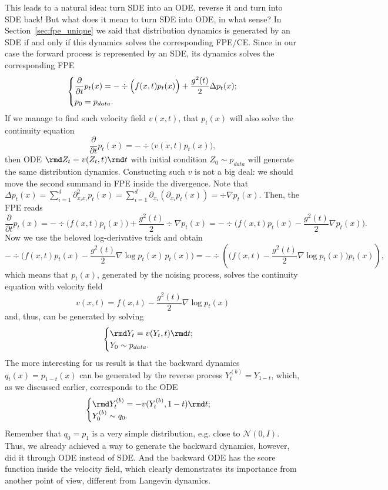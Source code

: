 This leads to a natural idea: turn SDE into an ODE, reverse it and turn into SDE back! But what does it mean to turn SDE into ODE, in what sense? In Section~\ref{sec:fpe_unique} we said that distribution dynamics is generated by an SDE if and only if this dynamics solves the corresponding FPE/CE. Since in our case the forward process is represented by an SDE, its dynamics solves the corresponding FPE
\[
    \begin{dcases}
        \frac{\partial}{\partial t} p_t(x) = -\div\Big(f(x, t)p_t(x)\Big) + \frac{g^2(t)}{2} \Delta p_t(x);\\
        p_0 = p_{data}.
    \end{dcases}
\]
If we manage to find such velocity field $v(x, t)$, that $p_t(x)$ will also solve the continuity equation 
\[
    \frac{\partial}{\partial t} p_t(x) = -\div \Big(v(x, t)p_t(x)\Big),
\]
then ODE $\rmd Z_t = v(Z_t, t)\rmd t$ with initial condition $Z_0 \sim p_{data}$ will generate the same distribution dynamics. Constucting such $v$ is not a big deal: we should move the second summand in FPE inside the divergence. Note that $\Delta p_t(x) = \sum_{i = 1}^{d}\partial^2_{x_i x_i} p_t(x) = \sum_{i = 1}^{d} \partial_{x_i}(\partial_{x_i} p_t(x)) = \div \nabla p_t(x)$. Then, the FPE reads
\[
    \frac{\partial}{\partial t} p_t(x) = -\div\Big(f(x, t)p_t(x)\Big) + \frac{g^2(t)}{2} \div \nabla p_t(x) = -\div\Big(f(x, t)p_t(x) - \frac{g^2(t)}{2} \nabla p_t(x) \Big).
\]
Now we use the beloved log-derivative trick and obtain
\[
    -\div\Big(f(x, t)p_t(x) - \frac{g^2(t)}{2}\nabla \log p_t(x) \, p_t(x)\Big) = -\div\left(\Big(f(x, t) - \frac{g^2(t)}{2} \nabla \log p_t(x)\Big)p_t(x)\right),
\]
which means that $p_t(x)$, generated by the noising process, solves the continuity equation with velocity field
\[
    v(x, t) = f(x, t) - \frac{g^2(t)}{2} \nabla \log p_t(x)
\]
and, thus, can be generated by solving
\[
    \begin{cases}
        \rmd Y_t = v(Y_t, t) \rmd t;\\
        Y_0 \sim p_{data}.
    \end{cases}
\]
The more interesting for us result is that the backward dynamics $q_t(x) = p_{1 - t}(x)$ can be generated by the reverse process $Y_t^{(b)} = Y_{1 - t}$, which, as we discussed earlier, corresponds to the ODE
\[
    \begin{cases}
        \rmd Y_t^{(b)} = -v(Y_t^{(b)}, 1 - t)\rmd t;\\
        Y_0^{(b)} \sim q_0.
    \end{cases}
\]
Remember that $q_0 = p_1$ is a very simple distribution, e.g. close to $\mathcal{N}(0, I)$. Thus, we already achieved a way to generate the backward dynamics, however, did it through ODE instead of SDE. And the backward ODE has the score function inside the velocity field, which clearly demonstrates its importance from another point of view, different from Langevin dynamics. 

